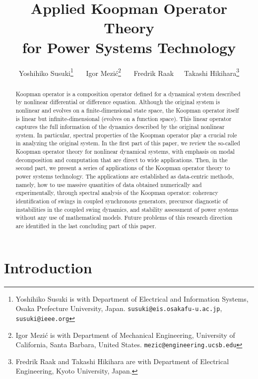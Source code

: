 \documentclass[a4paper,10pt]{article}
\title{%
Applied Koopman Operator Theory\\
for Power Systems Technology
}%
\author{%
Yoshihiko Susuki\footnote{Yoshihiko Susuki is with Department of Electrical and Information Systems, Osaka Prefecture University, Japan. \texttt{susuki@eis.osakafu-u.ac.jp}, \texttt{susuki@ieee.org}}~~~
Igor Mezi\'c\footnote{Igor Mezi\'c is with Department of Mechanical Engineering, University of California, Santa Barbara, United States. \texttt{mezic@engineering.ucsb.edu}}~~~
Fredrik Raak~~~Takashi Hikihara\footnote{Fredrik Raak and Takashi Hikihara are with Department of Electrical Engineering, Kyoto University, Japan.}
}%
\begin{document}
\maketitle

\begin{abstract}

Koopman operator is a composition operator defined for a dynamical system described by nonlinear differential or difference equation.  
Although the original system is nonlinear and evolves on a finite-dimensional state space, the Koopman operator itself is linear but infinite-dimensional (evolves on a function space).  
This linear operator captures the full information of the dynamics described by the original nonlinear system.  
In particular, spectral properties of the Koopman operator play a crucial role in analyzing the original system.  
In the first part of this paper, we review the so-called Koopman operator theory for nonlinear dynamical systems, with emphasis on modal decomposition and computation that are direct to wide applications.  
Then, in the second part, we present a series of applications of the Koopman operator theory to power systems technology.  
The applications are established as data-centric methods, namely, how to use massive quantities of data obtained numerically and experimentally, through spectral analysis of the Koopman operator:  coherency identification of swings in coupled synchronous generators, precursor diagnostic of instabilities in the coupled swing dynamics, and stability assessment of power systems without any use of mathematical models.   
Future problems of this research direction are identified in the last concluding part of this paper.

\end{abstract}



\section{Introduction}
\label{sec:intro}
\end{document}
